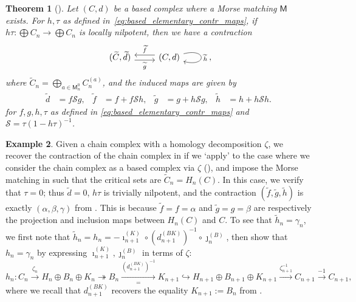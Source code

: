\documentclass[11pt, table, nothms]{amsart}
\newtheorem{theorem}{Theorem}[section]
\theoremstyle{definition}
\newtheorem{example}[theorem]{Example}
\newcommand{\cS}{\mathcal{S}}
\newcommand{\sM}{\mathsf{M}}
\begin{document}
{\begin{theorem}[{\cite[Lemma 2]{Skoldberg2018}}]\label{thm:skoldberg} Let $(C,d)$ be a based complex where a Morse matching $\sM$ exists. For $h,\tau$ as defined in~\cref{eq:based_elementary_contr_maps}, if $h\tau: \bigoplus C_n \to \bigoplus C_n$ is locally nilpotent, then we have a contraction 
\begin{equation} \label{eq:amt_contraction}
    \begin{tikzcd}[ampersand replacement=\&]
    (\widetilde{C}, \widetilde{d}) \ar[r, "\widetilde{g}", shift right=0.3em, swap] \&
    (C,d) 
    \arrow[l, "\widetilde{f}", shift right=0.3em, swap]
     \arrow["\widetilde{h}", from=1-2, to=1-2, loop, in=345, out=15, distance=10mm]
    \end{tikzcd},
\end{equation}
where $\widetilde{C}_n = \bigoplus_{a \in \sM^0_n} C^{(a)}_n$, and the induced maps are given by
\begin{align}
    \widetilde{d} & = f \cS g, &  
    \widetilde{f} &= f + f \cS h, & 
    \widetilde{g} &= g + h \cS g,  & \widetilde{h} &= h +  h\cS h.
\end{align}
for $f,g,h,\tau$ as defined in \cref{eq:based_elementary_contr_maps} and $\cS=\tau(1-h\tau)^{-1}$. 
\end{theorem}

\begin{example} \label{ex:homology_decomposition_based_4} Given a chain complex with a homology decomposition $\zeta$, we recover the contraction of the chain complex in  if we `apply'  to the case where we consider the chain complex as a based complex via $\zeta$ (), and impose the Morse matching in  such that the critical sets are $\widetilde{C}_n = H_n(C)$. 
In this case, we verify that $\tau = 0$; thus $\widetilde{d} = 0$,  $h\tau$ is trivially nilpotent, and the contraction $(\widetilde{f},\widetilde{g},\widetilde{h})$ is exactly $(\alpha, \beta, \gamma)$ from . This is because  $\widetilde{f} = f=\alpha$ and $\widetilde{g} = g =\beta$ are respectively the projection and inclusion maps between $H_n(C)$ and $C$. To see that $\widetilde{h}_n = \gamma_n$, we first note that  $\widetilde{h}_n = h_n = -\imath_{n+1}^{(K)} \circ (d_{n+1}^{(BK)})^{-1} \circ \jmath_n^{(B)}$, then show that $h_n = \gamma_n$ by expressing $\imath_{n+1}^{(K)},\jmath_n^{(B)}$ in terms of $\zeta$:
\begin{equation}
    h_n: C_n \xrightarrow{\zeta_n} H_n \oplus B_n \oplus K_n \twoheadrightarrow B_n \xrightarrow[=]{(d_{n+1}^{(BK)})^{-1}} K_{n+1}  \hookrightarrow H_{n+1} \oplus B_{n+1} \oplus K_{n+1} \xrightarrow{\zeta_{n+1}^{-1}} C_{n+1}\xrightarrow{-1} C_{n+1},
\end{equation}
where we recall that $d_{n+1}^{(BK)}$ recovers the equality $K_{n+1} := B_n$ from .
\end{example}

}
\end{document}
